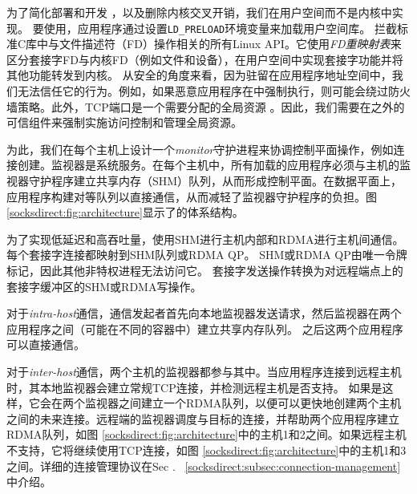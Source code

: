 
为了简化部署和开发 \cite {andromeda}，以及删除内核交叉开销，我们在用户空间而不是内核中实现\sys。
要使用\sys，应用程序通过设置\texttt {LD\_PRELOAD}环境变量来加载用户空间库\libipc {}。 \libipc {}拦截标准C库中与文件描述符（FD）操作相关的所有Linux API。它使用\emph {FD重映射表}来区分套接字FD与内核FD（例如文件和设备），在用户空间中实现套接字功能并将其他功能转发到内核。
从安全的角度来看，因为\libipc {}驻留在应用程序地址空间中，我们无法信任它的行为。例如，如果恶意应用程序在\libipc {}中强制执行，则可能会绕过防火墙策略。此外，TCP端口是一个需要分配的全局资源 \cite {lin2016scalable,nsdi19freeflow}。因此，我们需要在\libipc {}之外的可信组件来强制实施访问控制和管理全局资源。

为此，我们在每个主机上设计一个\emph {monitor}守护进程来协调控制平面操作，例如连接创建。监视器是系统服务。在每个主机中，所有加载\libipc {}的应用程序必须与主机的监视器守护程序建立共享内存（SHM）队列，从而形成控制平面。在数据平面上，应用程序构建对等队列以直接通信，从而减轻了监视器守护程序的负担。图 \ref {socksdirect:fig:architecture}显示了\sys {}的体系结构。



为了实现低延迟和高吞吐量，\sys {}使用SHM进行主机内部和RDMA进行主机间通信。
每个套接字连接都映射到SHM队列或RDMA QP。
SHM或RDMA QP由唯一令牌标记，因此其他非特权进程无法访问它。
套接字发送操作转换为对远程端点上的套接字缓冲区的SHM或RDMA写操作。

对于\emph {intra-host}通信，通信发起者首先向本地监视器发送请求，然后监视器在两个应用程序之间（可能在不同的容器中）建立共享内存队列。 之后这两个应用程序可以直接通信。



对于\emph {inter-host}通信，两个主机的监视器都参与其中。当应用程序连接到远程主机时，其本地监视器会建立常规TCP连接，并检测远程主机是否支持\sys {}。
如果是这样，它会在两个监视器之间建立一个RDMA队列，以便可以更快地创建两个主机之间的未来连接。远程端的监视器调度与目标的连接，并帮助两个应用程序建立RDMA队列，如图 \ref {socksdirect:fig:architecture}中的主机1和2之间。如果远程主机不支持\sys {}，它将继续使用TCP连接，如图 \ref {socksdirect:fig:architecture}中的主机1和3之间。详细的连接管理协议在Sec .~ \ref {socksdirect:subsec:connection-management}中介绍。

